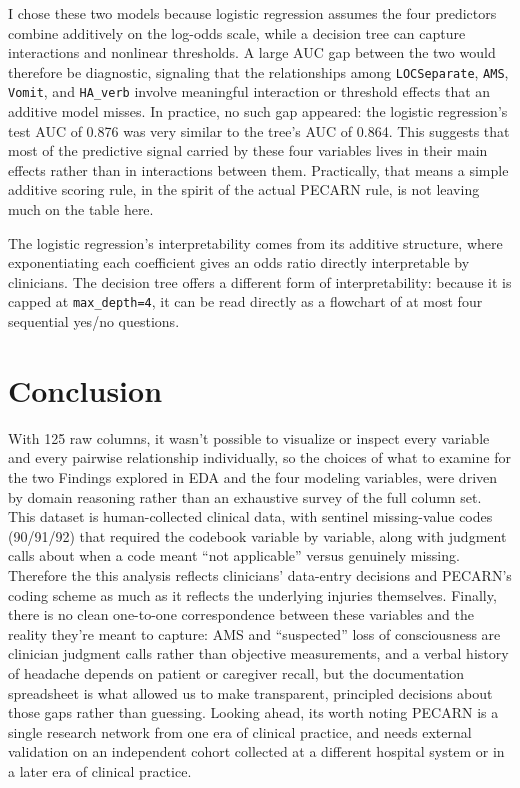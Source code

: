 \documentclass[10pt,letterpaper]{article}
\begin{document}
I chose these two models because logistic regression assumes the four predictors combine additively on the log-odds scale, while a decision tree can capture interactions and nonlinear thresholds. A large AUC gap between the two would therefore be diagnostic, signaling that the relationships among \texttt{LOCSeparate}, \texttt{AMS}, \texttt{Vomit}, and \texttt{HA\_verb} involve meaningful interaction or threshold effects that an additive model misses. In practice, no such gap appeared: the logistic regression's test AUC of 0.876 was very similar to the tree's AUC of 0.864. This suggests that most of the predictive signal carried by these four variables lives in their main effects rather than in interactions between them. Practically, that means a simple additive scoring rule, in the spirit of the actual PECARN rule, is not leaving much on the table here.

The logistic regression's interpretability comes from its additive structure, where exponentiating each coefficient gives an odds ratio directly interpretable by clinicians. The decision tree offers a different form of interpretability: because it is capped at \texttt{max\_depth=4}, it can be read directly as a flowchart of at most four sequential yes/no questions.

\section{Conclusion}\label{conclusion}

With 125 raw columns, it wasn't possible to visualize or inspect every variable and every pairwise relationship individually, so the choices of what to examine for the two Findings explored in EDA and the four modeling variables, were driven by domain reasoning rather than an exhaustive survey of the full column set. This dataset is human-collected clinical data, with sentinel missing-value codes (90/91/92) that required  the codebook variable by variable, along with judgment calls about when a code meant ``not applicable'' versus genuinely missing. Therefore the this analysis reflects clinicians' data-entry decisions and PECARN's coding scheme as much as it reflects the underlying injuries themselves. Finally, there is no clean one-to-one correspondence between these variables and the reality they're meant to capture: AMS and ``suspected'' loss of consciousness are clinician judgment calls rather than objective measurements, and a verbal history of headache depends on patient or caregiver recall, but the documentation spreadsheet is what allowed us to make transparent, principled decisions about those gaps rather than guessing. 
Looking ahead, its worth noting PECARN is a single research network from one era of clinical practice, and needs external validation on an independent cohort collected at a different hospital system or in a later era of clinical practice.
\end{document}
